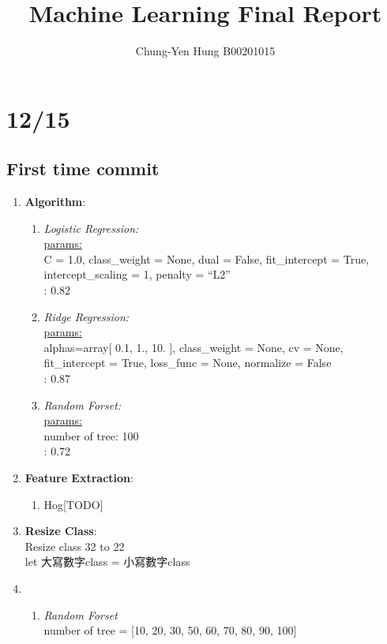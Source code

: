 \documentclass[12pt]{article}
\theoremstyle{definition}
\theoremstyle{remark}
\begin{document}

\title{Machine Learning Final Report}
\author{Chung-Yen Hung B00201015}
\maketitle


\section{12/15}
\subsection{First time commit}
\begin{enumerate}
  \item \textbf{Algorithm}:
      \begin{enumerate}
        \item {\em Logistic Regression:\/}\\
           \underline{params:} \\
            C = 1.0, class\_weight = None, dual = False, fit\_intercept = True, intercept\_scaling = 1, penalty = ``L2''\\
            {\color{red}{track 0: E\_out}: 0.82}
          \item {\em Ridge Regression:\/} \\
            \underline{params:} \\
            alphas=array[  0.1,   1.,  10. ], class\_weight = None, cv = None, fit\_intercept = True, loss\_func = None, normalize = False \\
            {\color{red}{track 0: E\_out}: 0.87} \\
          \item {\em Random Forset:\/} \\
            \underline{params:} \\
            number of tree: 100 \\
            {\color{red}{track 0: E\_out}: 0.72}
      \end{enumerate}
    \item \textbf{Feature Extraction}:
      \begin{enumerate}
        \item Hog[TODO]
      \end{enumerate}

    \item \textbf{Resize Class}:\\
      Resize class 32 to 22\\
      let 大寫數字class =  小寫數字class
    \item {}
      \begin{enumerate}
        \item {\em Random Forset\/}\\ 
          number of tree = [10, 20, 30, 50, 60, 70, 80, 90, 100]
      \end{enumerate}
\end{enumerate}
\end{document}
